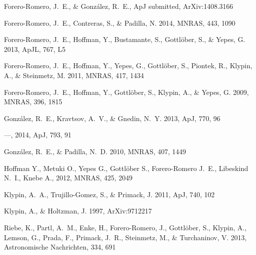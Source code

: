 \documentclass{iau}
\newcommand{\apj}{ApJ}
\newcommand{\apjl}{ApJL}
\newcommand{\mnras}{MNRAS}
\begin{document}
\begin{thebibliography}{}


{{Forero-Romero}, J.~E., \& {Gonz{\'a}lez}, R.~E.}, ApJ submitted,
ArXiv:1408.3166 

{Forero-Romero}, J.~E., {Contreras}, S., \& {Padilla}, N. 2014, \mnras, 443,
1090

{Forero-Romero}, J.~E., {Hoffman}, Y., {Bustamante}, S., {Gottl{\"o}ber}, S.,
\& {Yepes}, G. 2013, \apjl, 767, L5


{Forero-Romero}, J.~E., {Hoffman}, Y., {Yepes}, G., {Gottl{\"o}ber}, S.,
{Piontek}, R., {Klypin}, A., \& {Steinmetz}, M. 2011, \mnras, 417, 1434


{Forero-Romero}, J.~E., {Hoffman}, Y., {Gottl{\"o}ber}, S., {Klypin}, A., \&
{Yepes}, G. 2009, \mnras, 396, 1815


{Gonz{\'a}lez}, R.~E., {Kravtsov}, A.~V., \& {Gnedin}, N.~Y. 2013, \apj, 770,
96

---, 2014, \apj, 793, 91


{Gonz{\'a}lez}, R.~E., \& {Padilla}, N.~D. 2010, \mnras, 407, 1449


 {Hoffman} Y., {Metuki} O., {Yepes}
  G., {Gottl{\"o}ber} S., {Forero-Romero} J.~E., {Libeskind} N.~I.,
  {Knebe} A., 2012, \mnras, 425, 2049 

{Klypin}, A.~A., {Trujillo-Gomez}, S., \& {Primack}, J. 2011, \apj,
740, 102

{Klypin}, A., \& {Holtzman}, J. 1997, ArXiv:9712217

{Riebe}, K., {Partl}, A.~M., {Enke}, H., {Forero-Romero}, J., {Gottl{\"o}ber},
  S., {Klypin}, A., {Lemson}, G., {Prada}, F., {Primack}, J.~R., {Steinmetz},
  M., \& {Turchaninov}, V. 2013, Astronomische Nachrichten, 334, 691



\end{thebibliography}
\end{document}

